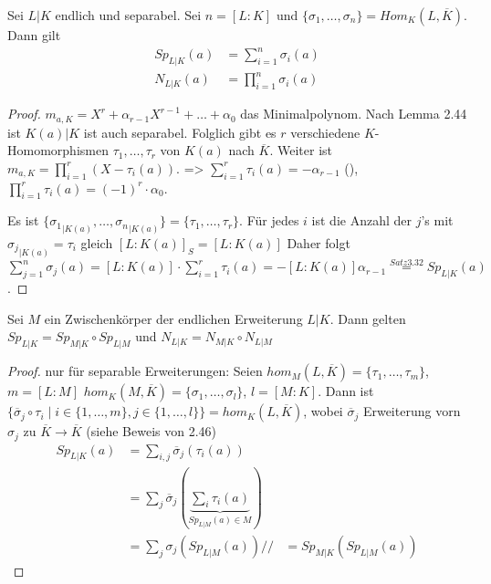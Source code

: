 \documentclass[../main.tex]{subfiles}
\begin{document}
\begin{theorem}
    Sei $L|K$ endlich und separabel.
    Sei $n=[L:K]$ und $\{\sigma_1,\dots,\sigma_n\} = Hom_K(L,\overline{K})$.
    Dann gilt
    \begin{align*}
        Sp_{L|K} (a) &= \sum_{i=1}^n \sigma_i(a)\\
        N_{L|K} (a) &= \prod_{i=1}^n \sigma_i(a)
    \end{align*}
\end{theorem}
\begin{proof}
    $m_{a,K} = X^r+\alpha_{r-1}X^{r-1}+\dots + \alpha_0$
    das Minimalpolynom.
    Nach Lemma 2.44 ist $K(a)|K$ ist auch separabel.
    Folglich gibt es $r$ verschiedene $K$-Homomorphismen $\tau_1,\dots,\tau_r$ von $K(a)$ nach $\overline{K}$.
    Weiter ist $m_{a,K} = \prod_{i=1}^r (X-\tau_i(a))$.
    => $\sum_{i=1}^r\tau_i(a) = -\alpha_{r-1}$ (\TODO[why?]), $\prod_{i=1}^r \tau_i(a) = (-1)^r \cdot \alpha_0$.

    Es ist $\{{\sigma_1}_{|K(a)}, \dots, {\sigma_n}_{|K(a)}\} = \{\tau_1,\dots,\tau_r\}$.
    Für jedes $i$ ist die Anzahl der $j$'s mit ${\sigma_j}_{|K(a)} = \tau_i$ gleich $[L:K(a)]_S = [L:K(a)]$
    Daher folgt $\sum_{j=1}^n\sigma_j(a) = [L:K(a)]\cdot \sum_{i=1}^r \tau_i(a) = -[L:K(a)]\alpha_{r-1} \overset{Satz 3.32}{ =} Sp_{L|K}(a)$.
\end{proof}
\begin{theorem}
    Sei $M$ ein Zwischenkörper der endlichen Erweiterung $L|K$.
    Dann gelten $Sp_{L|K} = Sp_{M|K}\circ Sp_{L|M}$ und
    $N_{L|K} = N_{M|K}\circ N_{L|M}$
\end{theorem}
\begin{proof}nur für separable Erweiterungen:
    Seien $hom_M(L,\overline{K}) = \{\tau_1,\dots,\tau_m\}$, $m=[L:M]$
    $hom_K(M,\overline{K}) = \{\sigma_1,\dots,\sigma_l\}$, $l = [M:K]$.
    Dann ist $\{\overline{\sigma}_j\circ\tau_i\mid i \in \{1,\dots,m\}, j\in \{1,\dots,l\}\} = hom_K(L,\overline{K})$, wobei $\overline{\sigma}_j$ Erweiterung vorn $\sigma_j$ zu $\overline{K}\rightarrow \overline{K}$ (siehe Beweis von 2.46)
    \begin{align*}
        Sp_{L|K}(a) &= \sum_{i,j} \overline{\sigma}_j(\tau_i(a))\\
        &=\sum_j\overline{\sigma}_j(\underbrace{\sum_i \tau_i (a)}_{Sp_{L|M}(a)\in M})\\
        &= \sum_j \sigma_j (Sp_{L|M} (a))//
        &= Sp_{M|K}(Sp_{L|M}(a))
    \end{align*}
\end{proof}
\end{document}
